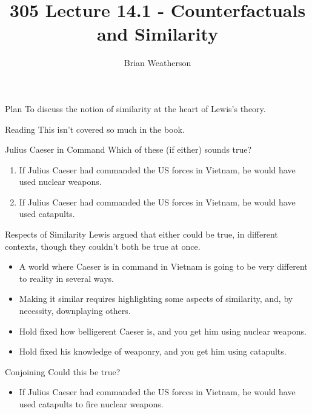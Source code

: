 \documentclass[
  ignorenonframetext,
]{beamer}
\title{305 Lecture 14.1 - Counterfactuals and Similarity}
\author{Brian Weatherson}
\date{}
\providecommand{\tightlist}{%
  \setlength{\itemsep}{0pt}\setlength{\parskip}{0pt}}
\renewcommand{\,}{\text{, }}
\begin{document}
\frame{\titlepage}

\begin{frame}{Plan}
\protect\hypertarget{plan}{}
To discuss the notion of similarity at the heart of Lewis's theory.
\end{frame}

\begin{frame}{Reading}
\protect\hypertarget{reading}{}
This isn't covered so much in the book.
\end{frame}

\begin{frame}{Julius Caeser in Command}
\protect\hypertarget{julius-caeser-in-command}{}
Which of these (if either) sounds true?

\begin{enumerate}
\tightlist
\item
  If Julius Caeser had commanded the US forces in Vietnam, he would have
  used nuclear weapons.
\item
  If Julius Caeser had commanded the US forces in Vietnam, he would have
  used catapults.
\end{enumerate}
\end{frame}

\begin{frame}{Respects of Similarity}
\protect\hypertarget{respects-of-similarity}{}
Lewis argued that either could be true, in different contexts, though
they couldn't both be true at once.

\begin{itemize}
\tightlist
\item
  A world where Caeser is in command in Vietnam is going to be very
  different to reality in several ways.
\item
  Making it similar requires highlighting some aspects of similarity,
  and, by necessity, downplaying others. \pause 
\item
  Hold fixed how belligerent Caeser is, and you get him using nuclear
  weapons. \pause 
\item
  Hold fixed his knowledge of weaponry, and you get him using catapults.
\end{itemize}
\end{frame}

\begin{frame}{Conjoining}
\protect\hypertarget{conjoining}{}
Could this be true?

\begin{itemize}
\tightlist
\item
  If Julius Caeser had commanded the US forces in Vietnam, he would have
  used catapults to fire nuclear weapons.
\end{itemize}
\end{frame}
\end{document}
